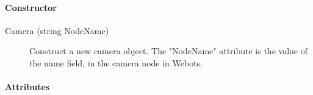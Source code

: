 \paragraph{Constructor}
\label{webots.uobjects.robotdevices.camera.constructor}%

\noindent
\begin{description}
\item[{Camera (string NodeName)}] Construct a new camera object. The "NodeName" attribute is the value
          of the name field, in the camera node in Webots.

\end{description}

\paragraph{Attributes}
\label{webots.uobjects.robotdevices.camera.attributes}%

